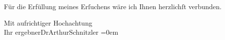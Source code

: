 \pstart
           Für die Erfüllung meines Erſuchens wäre ich Ihnen herzlichſt verbunden.\pend
           
\pstart
           Mit aufrichtiger Hochachtung{\\[\baselineskip]}Ihr ergebner\spacefill\mbox{DrArthurSchnitzler}\pend
           \leftskip=0em{}\endnumbering{}  
      